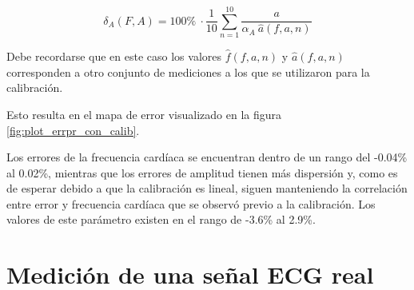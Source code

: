 \documentclass[conference]{IEEEtran}
\begin{document}
$$ \delta_{A} \left(F, A\right) = 100 \% ~ \cdot \dfrac{1}{10} \sum_{n=1}^{10}
\dfrac{a}{\alpha_A ~ \hat{a}(f,a,n)}$$

Debe recordarse que en este caso los valores $\hat{f}(f,a,n)$ y $\hat{a}(f,a,n)$
corresponden a otro conjunto de mediciones a los que se utilizaron para la calibración.


Esto resulta en el mapa de error visualizado en la figura
\ref{fig:plot_errpr_con_calib}.

Los errores de la frecuencia cardíaca se encuentran dentro de un rango del -0.04\% al
0.02\%, mientras que los errores de amplitud tienen más dispersión y, como es de
esperar debido a que la calibración es lineal, siguen manteniendo la correlación entre
error y frecuencia cardíaca que se observó previo a la calibración. Los valores de este
parámetro existen en el rango de -3.6\% al 2.9\%.









\section{Medición de una señal ECG real}
\end{document}
